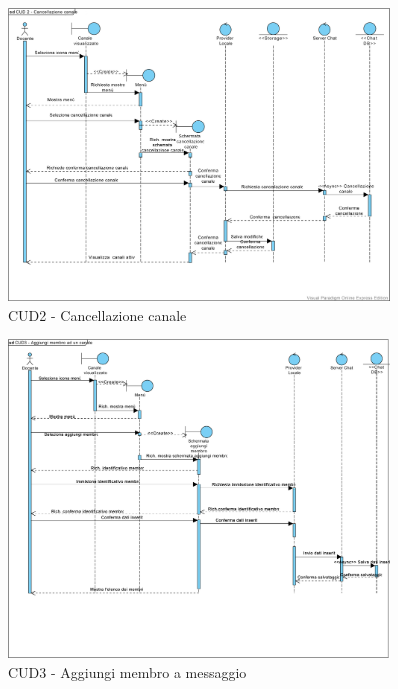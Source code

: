 \begin{figure}
	\centering
	\includegraphics[width=0.9\textwidth]{imgs/gruppo6/sequence/CUD2_cancellazione_canale.pdf}
	\caption{CUD2 - Cancellazione canale}
	\label{fig:seq-cud2}
\end{figure}

\begin{figure}
	\centering
	\includegraphics[width=0.9\textwidth]{imgs/gruppo6/sequence/CUD3_aggiungi_membro_ad_un_canale.pdf}
	\caption{CUD3 - Aggiungi membro a messaggio}
	\label{fig:seq-cud3}
\end{figure}

